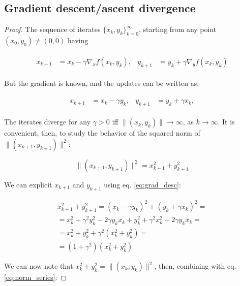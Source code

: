 \documentclass[12pt]{article}
\begin{document}
\subsection{Gradient descent/ascent divergence}
\begin{proof}
The sequence of iterates $\{x_k, y_k\}^{\infty}_{k=0}$, starting from any point $(x_{0}, y_{0}) \neq (0, 0)$ having

\begin{align}
\begin{aligned}
    x_{k+1} &= x_{k} - \gamma \nabla_{x} f(x_{k}, y_{k}),  &  y_{k+1} &= y_{k} + \gamma \nabla_{y} f(x_{k}, y_{k})
\end{aligned}
\end{align}

But the gradient is known, and the updates can be written as:

\begin{align}
\begin{aligned} \label{eq:grad_desc}
    x_{k+1} &= x_{k} - \gamma y_{k},  &  y_{k+1} &= y_{k} + \gamma x_{k},
\end{aligned}
\end{align}

The iterates diverge for any $\gamma > 0$ iff $\lVert (x_{k}, y_{k}) \rVert \rightarrow \infty$, as $k \rightarrow \infty$. It is convenient, then, to study the behavior of the squared norm of $\lVert (x_{k+1}, y_{k+1}) \rVert ^ 2$:

\begin{equation}
    \lVert (x_{k+1}, y_{k+1}) \rVert ^ 2 = x_{k+1}^{2} + y_{k+1}^{2}
\end{equation}

We can explicit $x_{k+1}$ and $y_{k+1}$ using eq. \eqref{eq:grad_desc}:

\begin{gather}
    x_{k+1}^{2} + y_{k+1}^{2} = (x_{k} - \gamma y_{k})^{2} + (y_{k} + \gamma x_{k})^{2} = \nonumber \\
    = x_{k}^{2} + \gamma^{2} y^{2}_{k} - 2 \gamma y_{k} x_{k} + y_{k}^{2} + \gamma^{2} x^{2}_{k} + 2 \gamma y_{k} x_{k} = \nonumber \\
    = x_{k}^{2} + y_{k}^{2} + \gamma^{2} (x_{k}^{2} + y_{k}^{2}) = \nonumber \\
    = (1 + \gamma^{2}) (x_{k}^{2} + y_{k}^{2}) \label{eq:norm_series}
\end{gather}

We can now note that $x_{k}^{2} + y_{k}^{2} = \lVert (x_{k}, y_{k}) \rVert ^ 2$, then, combining with eq. \eqref{eq:norm_series}:


\end{proof}
\end{document}
